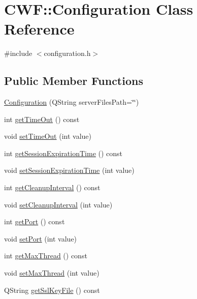 \hypertarget{class_c_w_f_1_1_configuration}{\section{C\+W\+F\+:\+:Configuration Class Reference}
\label{class_c_w_f_1_1_configuration}
}


{\ttfamily \#include $<$configuration.\+h$>$}

\subsection*{Public Member Functions}
\begin{DoxyCompactItemize}
\item 
\hyperlink{class_c_w_f_1_1_configuration_ac0436a9c09fe7fee4f01b8409b91c256}{Configuration} (Q\+String server\+Files\+Path=\char`\"{}\char`\"{})
\item 
int \hyperlink{class_c_w_f_1_1_configuration_a225665a95e1c2f9a5057466971c81156}{get\+Time\+Out} () const 
\item 
void \hyperlink{class_c_w_f_1_1_configuration_a5418aa4515604ff80a644767f7897432}{set\+Time\+Out} (int value)
\item 
int \hyperlink{class_c_w_f_1_1_configuration_a6d552d15e21329b9e042a659abdf1350}{get\+Session\+Expiration\+Time} () const 
\item 
void \hyperlink{class_c_w_f_1_1_configuration_ad6b858657acf48a7f3a7788ea2fe58c3}{set\+Session\+Expiration\+Time} (int value)
\item 
int \hyperlink{class_c_w_f_1_1_configuration_a2763f705c5284db8a8ed0aad5d239f85}{get\+Cleanup\+Interval} () const 
\item 
void \hyperlink{class_c_w_f_1_1_configuration_a1cb7a750d000213d724a3960bd309fdb}{set\+Cleanup\+Interval} (int value)
\item 
int \hyperlink{class_c_w_f_1_1_configuration_a2d71629f922ac2725e312d513cf531d0}{get\+Port} () const 
\item 
void \hyperlink{class_c_w_f_1_1_configuration_a96e8175de6aa562d62aec812d46b8fa1}{set\+Port} (int value)
\item 
int \hyperlink{class_c_w_f_1_1_configuration_ac2b487607f5d073bc9e70fc10d6929b9}{get\+Max\+Thread} () const 
\item 
void \hyperlink{class_c_w_f_1_1_configuration_afb140b5716c953d403184d47ef97bfba}{set\+Max\+Thread} (int value)
\item 
Q\+String \hyperlink{class_c_w_f_1_1_configuration_aba60d2b15dfff18830d541e460c4640e}{get\+Ssl\+Key\+File} () const 

\end{DoxyCompactItemize}
